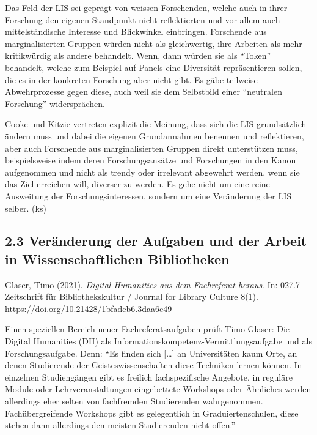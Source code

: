 \documentclass[a4paper,
fontsize=11pt,
oneside,
numbers=noperiodatend,
parskip=half-,
bibliography=totoc,
final
]{scrartcl}
\begin{document}
Das Feld der LIS sei geprägt von weissen Forschenden, welche auch in
ihrer Forschung den eigenen Standpunkt nicht reflektierten und vor allem
auch mittelständische Interesse und Blickwinkel einbringen. Forschende
aus marginalisierten Gruppen würden nicht als gleichwertig, ihre
Arbeiten als mehr kritikwürdig als andere behandelt. Wenn, dann würden
sie als \enquote{Token} behandelt, welche zum Beispiel auf Panels eine
Diversität repräsentieren sollen, die es in der konkreten Forschung aber
nicht gibt. Es gäbe teilweise Abwehrprozesse gegen diese, auch weil sie
dem Selbstbild einer \enquote{neutralen Forschung} widersprächen.

Cooke und Kitzie vertreten explizit die Meinung, dass sich die LIS
grundsätzlich ändern muss und dabei die eigenen Grundannahmen benennen
und reflektieren, aber auch Forschende aus marginalisierten Gruppen
direkt unterstützen muss, beispielsweise indem deren Forschungsansätze
und Forschungen in den Kanon aufgenommen und nicht als trendy oder
irrelevant abgewehrt werden, wenn sie das Ziel erreichen will, diverser
zu werden. Es gehe nicht um eine reine Ausweitung der
Forschungsinteressen, sondern um eine Veränderung der LIS selber. (ks)

\hypertarget{veruxe4nderung-der-aufgaben-und-der-arbeit-in-wissenschaftlichen-bibliotheken}{%
\subsection{2.3 Veränderung der Aufgaben und der Arbeit in
Wissenschaftlichen
Bibliotheken}\label{veruxe4nderung-der-aufgaben-und-der-arbeit-in-wissenschaftlichen-bibliotheken}}

Glaser, Timo (2021). \emph{Digital Humanities aus dem Fachreferat
heraus}. In: 027.7 Zeitschrift für Bibliothekskultur / Journal for
Library Culture 8(1). \url{https://doi.org/10.21428/1bfadeb6.3daa6c49}

Einen speziellen Bereich neuer Fachreferatsaufgaben prüft Timo Glaser:
Die Digital Humanities (DH) als
Informationskompetenz-Vermittlungsaufgabe und als Forschungsaufgabe.
Denn: \enquote{Es finden sich {[}\ldots{]} an Universitäten kaum Orte,
an denen Studierende der Geisteswissenschaften diese Techniken lernen
können. In einzelnen Studiengängen gibt es freilich fachspezifische
Angebote, in reguläre Module oder Lehrveranstaltungen eingebettete
Workshops oder Ähnliches werden allerdings eher selten von fachfremden
Studierenden wahrgenommen. Fachübergreifende Workshops gibt es
gelegentlich in Graduiertenschulen, diese stehen dann allerdings den
meisten Studierenden nicht offen.}
\end{document}
